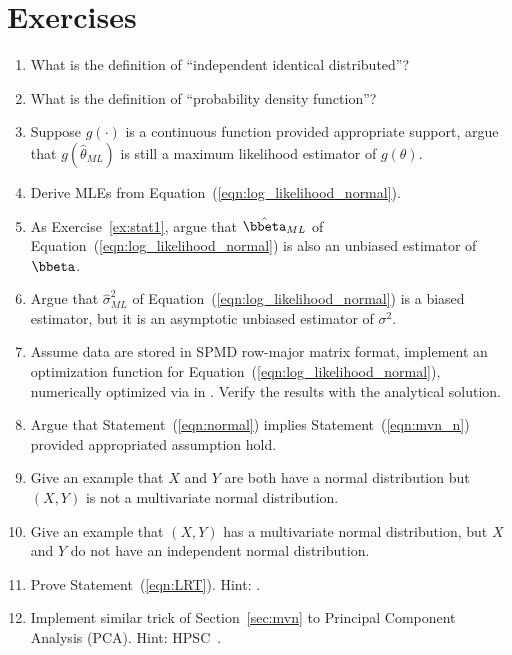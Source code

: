 \section{Exercises}
\label{sec:mle_exercise}

\begin{enumerate}[label=\thechapter-\arabic*]

\item
What is the definition of ``independent identical distributed''?

\item
What is the definition of ``probability density function''?

\item
Suppose $g(\cdot)$ is a continuous function provided appropriate support,
argue that $g\left(\hat{\theta}_{ML}\right)$ is still a maximum likelihood
estimator of $g(\theta)$.

\item
Derive MLEs from Equation~(\ref{eqn:log_likelihood_normal}).

\item
As Exercise~\ref{ex:stat1}, argue that $\hat{\bbeta}_{ML}$ of
Equation~(\ref{eqn:log_likelihood_normal}) is also
an unbiased estimator of $\bbeta$.

\item
Argue that $\hat{\sigma}^2_{ML}$ of
Equation~(\ref{eqn:log_likelihood_normal})
is a biased estimator, but it is an asymptotic
unbiased estimator of $\sigma^2$.

\item
Assume data are stored in SPMD row-major matrix format,
implement an optimization function for
Equation~(\ref{eqn:log_likelihood_normal}), numerically optimized via
 in .
Verify the results with the analytical solution.
\label{ex:likelihood1}

\item
Argue that Statement~(\ref{eqn:normal}) implies Statement~(\ref{eqn:mvn_n})
provided appropriated assumption hold.

\item
Give an example that $X$ and $Y$ are both have a normal distribution
but $(X, Y)$ is not a multivariate normal distribution.

\item
Give an example that $(X, Y)$ has a multivariate normal distribution,
but $X$ and $Y$ do not have an independent normal distribution.

\item
Prove Statement~(\ref{eqn:LRT}).
{\color{blue} Hint: \citet{Ferguson1996}.}

\item
Implement similar trick of Section~\ref{sec:mvn} to Principal Component
Analysis (PCA).
{\color{blue} Hint: HPSC~\citep{hpsc2011}.}


\end{enumerate}

